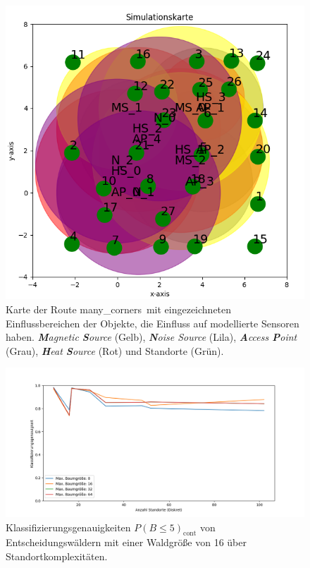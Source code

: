 \begin{figure}[h!]
    \centering
    \includegraphics[width=0.9\linewidth]{images/many_corners_simulation_map.png}
    \caption{Karte der Route \glqq many\_corners\grqq\ mit eingezeichneten Einflussbereichen der Objekte, die Einfluss auf modellierte Sensoren haben.
    \textit{\textbf{M}agnetic \textbf{S}ource} (Gelb), \textit{\textbf{N}oise Source} (Lila), \textit{\textbf{A}ccess \textbf{P}oint} (Grau),
    \textit{\textbf{H}eat \textbf{S}ource} (Rot) und Standorte (Grün).}
    \label{fig:many_corners_simulation_map}
\end{figure}

\begin{figure}[h!]
    \centering
    \includegraphics[width=\linewidth]{images/multiple_best_by_group_dt_max_depth_acc_5_cont.png}
    \caption{Klassifizierungsgenauigkeiten $P(B\leq5)_{\text{cont}}$ von Entscheidungswäldern mit einer Waldgröße von 16 über Standortkomplexitäten.}
    \label{fig:multiple_best_by_group_dt_max_depth_acc_5_cont}
\end{figure}

